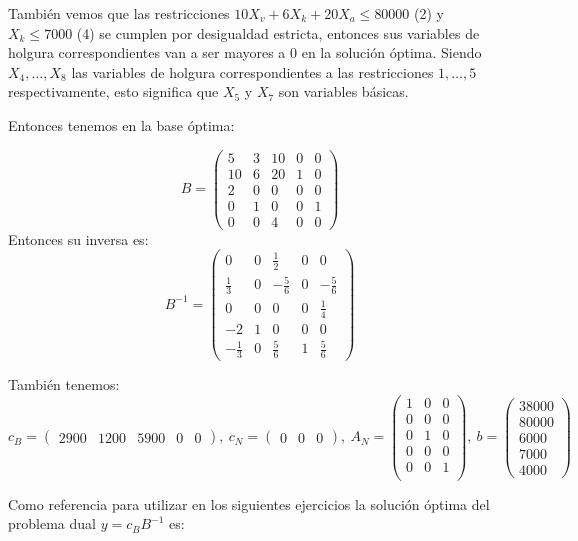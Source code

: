 \documentclass[10pt,a4paper]{article}
\begin{document}
	También vemos que las restricciones $10 X_v + 6 X_k + 20 X_a \leq 80000$ (2) y $X_k \leq 7000$ (4) se cumplen por desigualdad estricta, entonces sus variables de holgura correspondientes van a ser mayores a 0 en la solución óptima.
	Siendo $X_4, \dots, X_8$ las variables de holgura correspondientes a las restricciones $1, \dots, 5$ respectivamente, esto significa que $X_5$ y $X_7$ son variables básicas.
	
	Entonces tenemos en la base óptima:
	
	\[B = \begin{pmatrix}
		5  & 3 & 10 & 0 & 0 \\
		10 & 6 & 20 & 1 & 0 \\
		2  & 0 & 0  & 0 & 0 \\
		0  & 1 & 0  & 0 & 1 \\
		0  & 0 & 4  & 0 & 0
	\end{pmatrix}\]
	Entonces su inversa es:
	\[B^{-1} = \begin{pmatrix}
		0  & 0 &\frac{1}{2} & 0 & 0 \\
		\frac{1}{3} & 0 & -\frac{5}{6} & 0 & -\frac{5}{6} \\
		0  & 0 & 0  & 0 & \frac{1}{4} \\
		-2 & 1 & 0  & 0 & 0 \\
		-\frac{1}{3}  & 0 & \frac{5}{6}  & 1 & \frac{5}{6}
	\end{pmatrix}\]
	
	También tenemos: $$c_B = \begin{pmatrix} 2900 & 1200 & 5900 & 0 & 0 \end{pmatrix},\ c_N = \begin{pmatrix} 0 & 0 & 0 \end{pmatrix},\ A_N = \begin{pmatrix}
		1 & 0 & 0 \\
		0 & 0 & 0 \\
		0 & 1 & 0 \\
		0 & 0 & 0 \\
		0 & 0 & 1 \\
	\end{pmatrix},\ b = \begin{pmatrix}
		38000 \\
		80000 \\
		6000 \\
		7000 \\
		4000
	\end{pmatrix}$$
	
	Como referencia para utilizar en los siguientes ejercicios la solución óptima del problema dual $y=c_B B^{-1}$ es:
	
\end{document}
